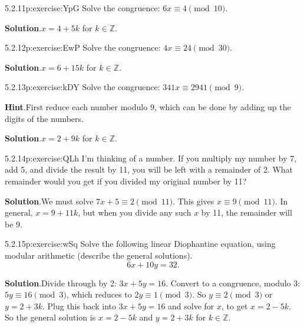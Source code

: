 \documentclass[twoside,11pt,]{book}
\newcommand{\blocktitlefont}{\relax}
\numberwithin{equation}{chapter}
\newcommand{\Z}{\mathbb Z}
\begin{document}
\begin{divisionsolution}{5.2.11}{}{p:exercise:YpG}%
Solve the congruence: \(6x \equiv 4 \pmod{10}\).%
\par\smallskip%
\noindent\textbf{\blocktitlefont Solution}.\quad{}\(x = 4 + 5k\) for \(k \in \Z\).%
\end{divisionsolution}%
\begin{divisionsolution}{5.2.12}{}{p:exercise:EwP}%
Solve the congruence: \(4x \equiv 24 \pmod{30}\).%
\par\smallskip%
\noindent\textbf{\blocktitlefont Solution}.\quad{}\(x = 6 + 15k\) for \(k \in \Z\).%
\end{divisionsolution}%
\begin{divisionsolution}{5.2.13}{}{p:exercise:kDY}%
Solve the congruence: \(341x \equiv 2941 \pmod{9}\).%
\par\smallskip%
\noindent\textbf{\blocktitlefont Hint}.\quad{}First reduce each number modulo 9, which can be done by adding up the digits of the numbers.%
\par\smallskip%
\noindent\textbf{\blocktitlefont Solution}.\quad{}\(x = 2 + 9k\) for \(k \in \Z\).%
\end{divisionsolution}%
\begin{divisionsolution}{5.2.14}{}{p:exercise:QLh}%
I'm thinking of a number. If you multiply my number by 7, add 5, and divide the result by 11, you will be left with a remainder of 2. What remainder would you get if you divided my original number by 11?%
\par\smallskip%
\noindent\textbf{\blocktitlefont Solution}.\quad{}We must solve \(7x + 5 \equiv 2 \pmod{11}\). This gives \(x \equiv 9 \pmod{11}\). In general, \(x = 9 + 11k\), but when you divide any such \(x\) by 11, the remainder will be 9.%
\end{divisionsolution}%
\begin{divisionsolution}{5.2.15}{}{p:exercise:wSq}%
Solve the following linear Diophantine equation, using modular arithmetic (describe the general solutions).%
\begin{equation*}
6x + 10y = 32\text{.}
\end{equation*}
%
\par\smallskip%
\noindent\textbf{\blocktitlefont Solution}.\quad{}Divide through by 2: \(3x + 5y = 16\). Convert to a congruence, modulo 3: \(5y \equiv 16 \pmod 3\), which reduces to \(2y \equiv 1 \pmod 3\). So \(y \equiv 2 \pmod 3\) or \(y = 2 + 3k\). Plug this back into \(3x + 5y = 16\) and solve for \(x\), to get \(x = 2-5k\). So the general solution is \(x = 2-5k\) and \(y = 2+3k\) for \(k \in \Z\).%
\end{divisionsolution}%
\end{document}
